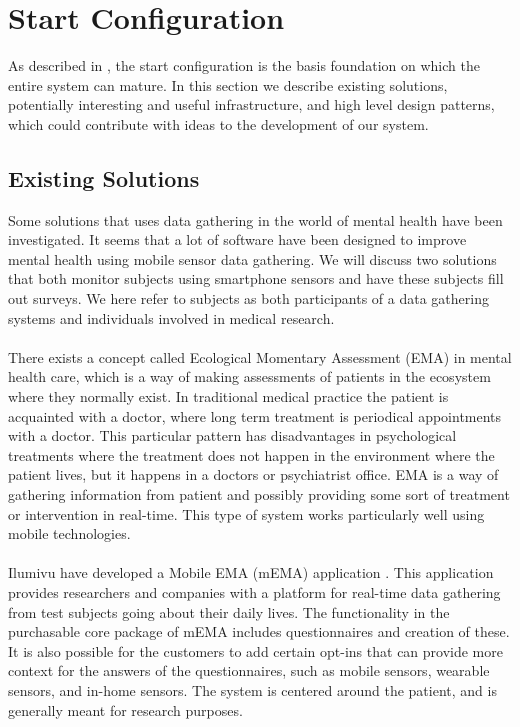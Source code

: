 \section{Start Configuration}
\label{sec:start_configuration}
As described in , the start configuration is the basis foundation on which the entire system can mature. In this section we describe existing solutions, potentially interesting and useful infrastructure, and high level design patterns, which could contribute with ideas to the development of our system.

\subsection{Existing Solutions}
Some solutions that uses data gathering in the world of mental health have been investigated. It seems that a lot of software have been designed to improve mental health using mobile sensor data gathering. We will discuss two solutions that both monitor subjects using smartphone sensors and have these subjects fill out surveys. We here refer to subjects as both participants of a data gathering systems and individuals involved in medical research.
\\\\
There exists a concept called Ecological Momentary Assessment (EMA) \parencite{shiffman2008ecological} in mental health care, which is a way of making assessments of patients in the ecosystem where they normally exist. In traditional medical practice the patient is acquainted with a doctor, where long term treatment is periodical appointments with a doctor. This particular pattern has disadvantages in psychological treatments where the treatment does not happen in the environment where the patient lives, but it happens in a doctors or psychiatrist office. EMA is a way of gathering information from patient and possibly providing some sort of treatment or intervention in real-time. This type of system works particularly well using mobile technologies.
\\\\
Ilumivu have developed a Mobile EMA (mEMA) application \parencite{lumivu}. This application provides researchers and companies with a platform for real-time data gathering from test subjects going about their daily lives. The functionality in the purchasable core package of mEMA includes questionnaires and creation of these. It is also possible for the customers to add certain opt-ins that can provide more context for the answers of the questionnaires, such as mobile sensors, wearable sensors, and in-home sensors. The system is centered around the patient, and is generally meant for research purposes.
